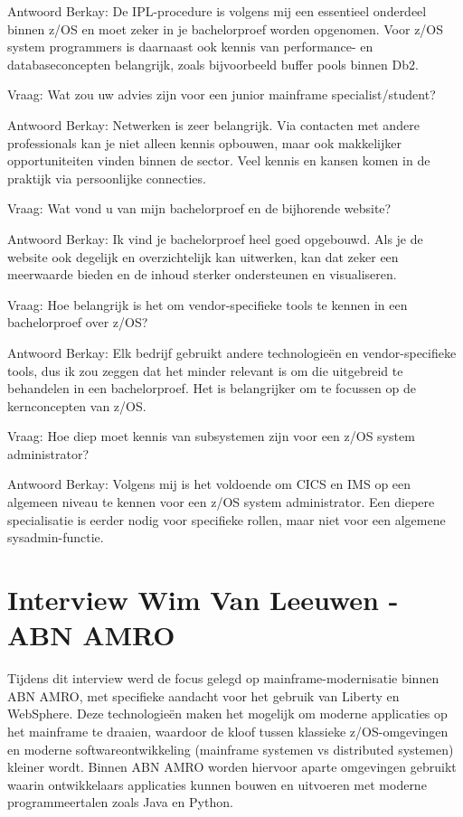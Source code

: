 Antwoord Berkay: De IPL-procedure is volgens mij een essentieel onderdeel binnen z/OS en moet zeker in je bachelorproef worden opgenomen. Voor z/OS system programmers is daarnaast ook kennis van performance- en databaseconcepten belangrijk, zoals bijvoorbeeld buffer pools binnen Db2.

Vraag: Wat zou uw advies zijn voor een junior mainframe specialist/student?

Antwoord Berkay: Netwerken is zeer belangrijk. Via contacten met andere professionals kan je niet alleen kennis opbouwen, maar ook makkelijker opportuniteiten vinden binnen de sector. Veel kennis en kansen komen in de praktijk via persoonlijke connecties.

Vraag: Wat vond u van mijn bachelorproef en de bijhorende website?

Antwoord Berkay: Ik vind je bachelorproef heel goed opgebouwd. Als je de website ook degelijk en overzichtelijk kan uitwerken, kan dat zeker een meerwaarde bieden en de inhoud sterker ondersteunen en visualiseren.

Vraag: Hoe belangrijk is het om vendor-specifieke tools te kennen in een bachelorproef over z/OS?

Antwoord Berkay: Elk bedrijf gebruikt andere technologieën en vendor-specifieke tools, dus ik zou zeggen dat het minder relevant is om die uitgebreid te behandelen in een bachelorproef. Het is belangrijker om te focussen op de kernconcepten van z/OS.

Vraag: Hoe diep moet kennis van subsystemen zijn voor een z/OS system administrator?

Antwoord Berkay: Volgens mij is het voldoende om CICS en IMS op een algemeen niveau te kennen voor een z/OS system administrator. Een diepere specialisatie is eerder nodig voor specifieke rollen, maar niet voor een algemene sysadmin-functie.
\section{Interview Wim Van Leeuwen - ABN AMRO}

Tijdens dit interview werd de focus gelegd op mainframe-modernisatie binnen ABN AMRO, met specifieke aandacht voor het gebruik van Liberty en WebSphere. Deze technologieën maken het mogelijk om moderne applicaties op het mainframe te draaien, waardoor de kloof tussen klassieke z/OS-omgevingen en moderne softwareontwikkeling (mainframe systemen vs distributed systemen) kleiner wordt. Binnen ABN AMRO worden hiervoor aparte omgevingen gebruikt waarin ontwikkelaars applicaties kunnen bouwen en uitvoeren met moderne programmeertalen zoals Java en Python.

